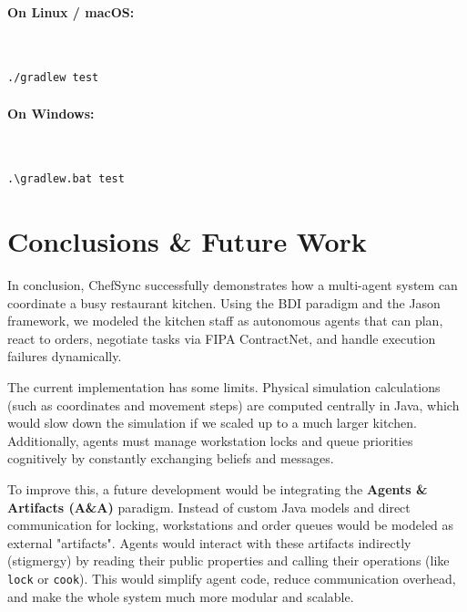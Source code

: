 \documentclass{scrartcl}
\begin{document}
\paragraph{On Linux / macOS:}~\\
\begin{lstlisting}[basicstyle=\footnotesize\ttfamily, breaklines=true]
./gradlew test
\end{lstlisting}

\paragraph{On Windows:}~\\
\begin{lstlisting}[basicstyle=\footnotesize\ttfamily, breaklines=true]
.\gradlew.bat test
\end{lstlisting}


\newpage
\section{Conclusions \& Future Work}

In conclusion, ChefSync successfully demonstrates how a multi-agent system can coordinate a busy restaurant kitchen. Using the BDI paradigm and the Jason framework, we modeled the kitchen staff as autonomous agents that can plan, react to orders, negotiate tasks via FIPA ContractNet, and handle execution failures dynamically.

The current implementation has some limits. Physical simulation calculations (such as coordinates and movement steps) are computed centrally in Java, which would slow down the simulation if we scaled up to a much larger kitchen. Additionally, agents must manage workstation locks and queue priorities cognitively by constantly exchanging beliefs and messages.

To improve this, a future development would be integrating the \textbf{Agents \& Artifacts (A\&A)} paradigm. Instead of custom Java models and direct communication for locking, workstations and order queues would be modeled as external "artifacts". Agents would interact with these artifacts indirectly (stigmergy) by reading their public properties and calling their operations (like \texttt{lock} or \texttt{cook}). This would simplify agent code, reduce communication overhead, and make the whole system much more modular and scalable.

\clearpage
\end{document}
